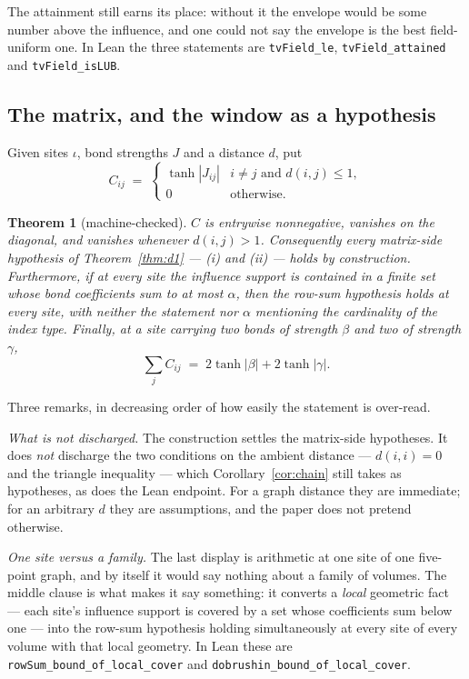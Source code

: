\documentclass[11pt]{article}
\newtheorem{theorem}{Theorem}[section]
\theoremstyle{definition}
\begin{document}
The attainment still earns its place: without it the envelope would be some
number above the influence, and one could not say the envelope is the best
field-uniform one.  In Lean the three statements are \texttt{tvField\_le},
\texttt{tvField\_attained} and \texttt{tvField\_isLUB}.

\subsection{The matrix, and the window as a hypothesis}

Given sites $\iota$, bond strengths $J$ and a distance $d$, put
\[
  C_{ij}\;=\;\begin{cases}\tanh|J_{ij}| & i\ne j \text{ and } d(i,j)\le1,\\
  0 & \text{otherwise.}\end{cases}
\]

\begin{theorem}[machine-checked]
\label{thm:matrix}
$C$ is entrywise nonnegative, vanishes on the diagonal, and vanishes whenever
$d(i,j)>1$.  Consequently \emph{every matrix-side hypothesis} of
Theorem~\ref{thm:d1} --- (i) and (ii) --- holds by construction.  Furthermore, if
at every site the influence support is contained in a finite set whose bond
coefficients sum to at most $\alpha$, then the row-sum hypothesis holds at every
site, with neither the statement nor $\alpha$ mentioning the cardinality of the
index type.  Finally, at a site carrying two bonds of strength $\beta$ and two of
strength $\gamma$,
\[
  \sum_j C_{ij}\;=\;2\tanh|\beta|+2\tanh|\gamma| .
\]
\end{theorem}

Three remarks, in decreasing order of how easily the statement is over-read.

\emph{What is not discharged.}  The construction settles the matrix-side
hypotheses.  It does \emph{not} discharge the two conditions on the ambient
distance --- $d(i,i)=0$ and the triangle inequality --- which
Corollary~\ref{cor:chain} still takes as hypotheses, as does the Lean endpoint.
For a graph distance they are immediate; for an arbitrary $d$ they are
assumptions, and the paper does not pretend otherwise.

\emph{One site versus a family.}  The last display is arithmetic at one site of
one five-point graph, and by itself it would say nothing about a family of
volumes.  The middle clause is what makes it say something: it converts a
\emph{local} geometric fact --- each site's influence support is covered by a set
whose coefficients sum below one --- into the row-sum hypothesis holding
simultaneously at every site of every volume with that local geometry.  In Lean
these are \texttt{rowSum\_bound\_of\_local\_cover} and
\texttt{dobrushin\_bound\_of\_local\_cover}.
\end{document}
